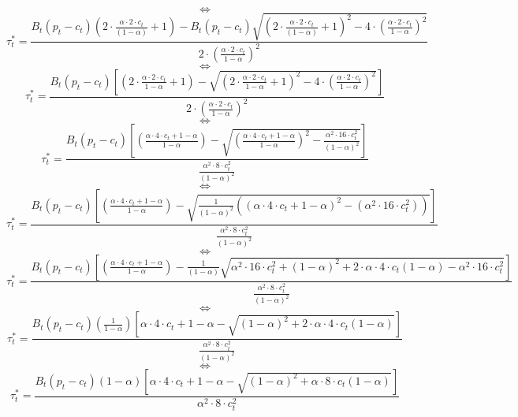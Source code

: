 \documentclass{article}
\begin{document}
$$\iff$$
\begin{equation*}
    \tau_{t}^{*}=\frac{B_{t}\left(p_{t}-c_{t}\right)\left(2\cdot \frac{\alpha \cdot 2\cdot c_{t}}{(1-\alpha)}+1\right)-B_{t}\left(p_{t}-c_{t}\right)\sqrt{\left(2\cdot \frac{\alpha \cdot 2\cdot c_{t}}{(1-\alpha)}+1\right)^2-4\cdot \left(\frac{\alpha \cdot 2\cdot c_{t}}{1-\alpha}\right)^{2}}}{2\cdot \left(\frac{\alpha \cdot 2\cdot c_{t}}{1-\alpha}\right)^{2}}
\end{equation*}
$$\iff$$
\begin{equation*}
    \tau_{t}^{*}=\frac{B_{t}\left(p_{t}-c_{t}\right)\left[\left(2\cdot \frac{\alpha \cdot 2\cdot c_{t}}{1-\alpha}+1\right)-\sqrt{\left(2\cdot \frac{\alpha \cdot 2\cdot c_{t}}{1-\alpha}+1\right)^2-4\cdot \left(\frac{\alpha \cdot 2\cdot c_{t}}{1-\alpha}\right)^{2}}\right]}{2\cdot \left(\frac{\alpha \cdot 2\cdot c_{t}}{1-\alpha}\right)^{2}}
\end{equation*}
$$\iff$$
\begin{equation*}
    \tau_{t}^{*}=\frac{B_{t}\left(p_{t}-c_{t}\right)\left[\left(\frac{\alpha \cdot 4\cdot c_{t}+1-\alpha}{1-\alpha}\right)-\sqrt{\left(\frac{\alpha \cdot 4\cdot c_{t}+1-\alpha}{1-\alpha}\right)^2-\frac{\alpha^{2} \cdot 16\cdot c_{t}^{2}}{(1-\alpha)^{2}}}\right]}{\frac{\alpha^{2} \cdot 8\cdot c_{t}^{2}}{(1-\alpha)^{2}}}
\end{equation*}
$$\iff$$
\begin{equation*}
    \tau_{t}^{*}=\frac{B_{t}\left(p_{t}-c_{t}\right)\left[\left(\frac{\alpha \cdot 4\cdot c_{t}+1-\alpha}{1-\alpha}\right)-\sqrt{\frac{1}{(1-\alpha)^{2}}\left(\left(\alpha \cdot 4\cdot c_{t}+1-\alpha\right)^2-\left(\alpha^{2} \cdot 16\cdot c_{t}^{2}\right)\right)}\right]} {\frac{\alpha^{2} \cdot 8\cdot c_{t}^{2}}{(1-\alpha)^{2}}}
\end{equation*}
$$\iff$$
\begin{equation*}
    \tau_{t}^{*}=\frac{B_{t}\left(p_{t}-c_{t}\right)\left[\left(\frac{\alpha \cdot 4\cdot c_{t}+1-\alpha}{1-\alpha}\right)-\frac{1}{(1-\alpha)}\sqrt{\alpha^{2} \cdot 16\cdot c_{t}^{2}+(1-\alpha)^{2}+2\cdot \alpha\cdot4\cdot c_{t}(1-\alpha)-\alpha^{2} \cdot 16\cdot c_{t}^{2}}\right]} {\frac{\alpha^{2} \cdot 8\cdot c_{t}^{2}}{(1-\alpha)^{2}}}
\end{equation*}
$$\iff$$
\begin{equation*}
    \tau_{t}^{*}=\frac{B_{t}\left(p_{t}-c_{t}\right)(\frac{1}{1-\alpha})\left[{\alpha \cdot 4\cdot c_{t}+1-\alpha}-\sqrt{(1-\alpha)^{2}+2\cdot \alpha\cdot4\cdot c_{t}(1-\alpha)}\right]} {\frac{\alpha^{2} \cdot 8\cdot c_{t}^{2}}{(1-\alpha)^{2}}}
\end{equation*}
$$\iff$$
\begin{equation*}\tag{9}
    \tau_{t}^{*}=\frac{B_{t}\left(p_{t}-c_{t}\right)(1-\alpha)\left[{\alpha \cdot 4\cdot c_{t}+1-\alpha}-\sqrt{(1-\alpha)^{2}+\alpha\cdot8\cdot c_{t}(1-\alpha)}\right]} {\alpha^{2} \cdot 8\cdot c_{t}^{2}}
\end{equation*}
\end{document}
